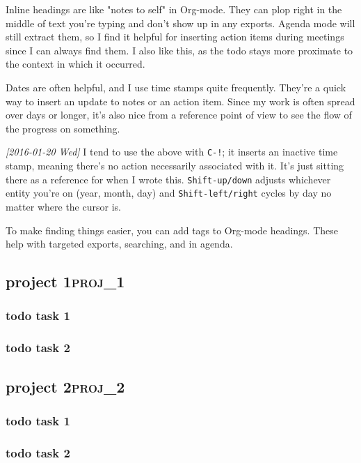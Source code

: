 \documentclass[11pt]{article}
\begin{document}
Inline headings are like "notes to self" in Org-mode. They can plop right in the middle of
text you're typing and don't show up in any exports. Agenda mode will still extract them,
so I find it helpful for inserting action items during meetings since I can always find
them. I also like this, as the todo stays more proximate to the context in which it
occurred.

Dates are often helpful, and I use time stamps quite frequently. They're a quick way to
insert an update to notes or an action item. Since my work is often spread over days or
longer, it's also nice from a reference point of view to see the flow of the progress on
something.

\textit{[2016-01-20 Wed]}
I tend to use the above with \texttt{C-!}; it inserts an inactive time stamp, meaning there's no
action necessarily associated with it. It's just sitting there as a reference for when I
wrote this. \texttt{Shift-up/down} adjusts whichever entity you're on (year, month, day) and
\texttt{Shift-left/right} cycles by day no matter where the cursor is.

To make finding things easier, you can add tags to Org-mode headings. These help with
targeted exports, searching, and in agenda.

\subsection*{project 1\hfill{}\textsc{proj\_1}}
\label{sec:orgheadline13}
\subsubsection*{{\bfseries\sffamily todo} task 1}
\label{sec:orgheadline11}
\subsubsection*{{\bfseries\sffamily todo} task 2}
\label{sec:orgheadline12}

\subsection*{project 2\hfill{}\textsc{proj\_2}}
\label{sec:orgheadline16}
\subsubsection*{{\bfseries\sffamily todo} task 1}
\label{sec:orgheadline14}
\subsubsection*{{\bfseries\sffamily todo} task 2}
\label{sec:orgheadline15}
\end{document}
